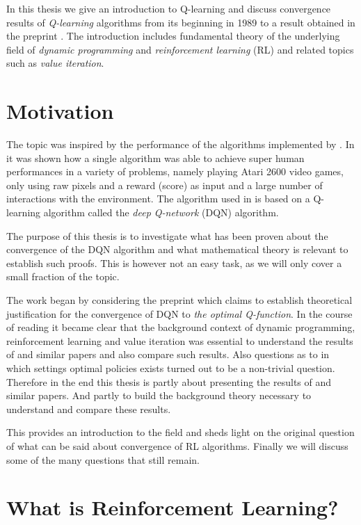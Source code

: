 In this thesis we give an introduction to Q-learning and discuss
convergence results of \emph{Q-learning} algorithms from its beginning in
1989  to a result obtained in the preprint .
The introduction includes fundamental theory of the underlying field of
\emph{dynamic programming} and \emph{reinforcement learning} (RL)
and related topics such as \emph{value iteration}.

\section{Motivation}
The topic was inspired by the performance of the algorithms
implemented by .
In  it was shown how a single algorithm was able to achieve super
human performances in a variety of problems, namely playing Atari 2600 video
games, only using raw pixels and a reward (score) as input and a large number of
interactions with the environment.
The algorithm used in  is based on a Q-learning
algorithm called the \emph{deep Q-network} (DQN) algorithm.

The purpose of this thesis is
to investigate what has been proven
about the convergence of the DQN algorithm
and what mathematical theory is relevant to establish such proofs.
This is however not an easy task, as we will only cover a small fraction
of the topic.

The work began by considering the preprint
 which claims to establish theoretical justification for
the convergence of DQN to \emph{the optimal Q-function}.
In the course of reading  it became clear that the background
context of dynamic programming, reinforcement learning and value iteration
was essential to understand the results of  and similar papers
and also compare such results.
Also questions as to in which settings optimal policies exists turned out
to be a non-trivial question.
Therefore in the end this thesis is partly about presenting the results of
 and similar papers.
And partly to build the background theory necessary to understand and
compare these results.

This provides an introduction to the field and sheds light 
on the original question of what can be said about convergence of
RL algorithms. Finally we will discuss some of the many questions that
still remain.

\section{What is Reinforcement Learning?}

